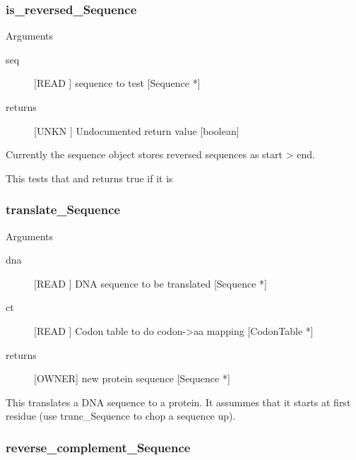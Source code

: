 \subsubsection{is_reversed_Sequence}

Arguments
\begin{description}
\item[seq] [READ ] sequence to test [Sequence *]
\item[returns] [UNKN ] Undocumented return value [boolean]
\end{description}
Currently the sequence object stores 
reversed sequences as start > end.


This tests that and returns true if it is


\subsubsection{translate_Sequence}

Arguments
\begin{description}
\item[dna] [READ ] DNA sequence to be translated [Sequence *]
\item[ct] [READ ] Codon table to do codon->aa mapping [CodonTable *]
\item[returns] [OWNER] new protein sequence [Sequence *]
\end{description}
This translates a DNA sequence to a protein.
It assummes that it starts at first residue
(use trunc_Sequence to chop a sequence up).


\subsubsection{reverse_complement_Sequence}

